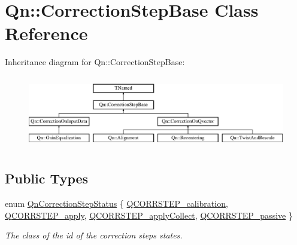 \hypertarget{classQn_1_1CorrectionStepBase}{}\section{Qn\+:\+:Correction\+Step\+Base Class Reference}
\label{classQn_1_1CorrectionStepBase}
Inheritance diagram for Qn\+:\+:Correction\+Step\+Base\+:\begin{figure}[H]
\begin{center}
\leavevmode
\includegraphics[height=3.236994cm]{classQn_1_1CorrectionStepBase}
\end{center}
\end{figure}
\subsection*{Public Types}
\begin{DoxyCompactItemize}
\item 
enum \mbox{\hyperlink{classQn_1_1CorrectionStepBase_a95ce2afbf677e1303b632df2399c8620}{Qn\+Correction\+Step\+Status}} \{ \mbox{\hyperlink{classQn_1_1CorrectionStepBase_a95ce2afbf677e1303b632df2399c8620abe46b97678dbe8da01af1dd4975f699b}{Q\+C\+O\+R\+R\+S\+T\+E\+P\+\_\+calibration}}, 
\mbox{\hyperlink{classQn_1_1CorrectionStepBase_a95ce2afbf677e1303b632df2399c8620a885ea58428f7a1d330f24a5a958e0250}{Q\+C\+O\+R\+R\+S\+T\+E\+P\+\_\+apply}}, 
\mbox{\hyperlink{classQn_1_1CorrectionStepBase_a95ce2afbf677e1303b632df2399c8620ab799275373edc849a96fc11d56979d0c}{Q\+C\+O\+R\+R\+S\+T\+E\+P\+\_\+apply\+Collect}}, 
\mbox{\hyperlink{classQn_1_1CorrectionStepBase_a95ce2afbf677e1303b632df2399c8620a6ca4f0e01c4b97dd2c7e3f5725e67c60}{Q\+C\+O\+R\+R\+S\+T\+E\+P\+\_\+passive}}
 \}
\begin{DoxyCompactList}\small\item\em The class of the id of the correction steps states. \end{DoxyCompactList}\end{DoxyCompactItemize}
